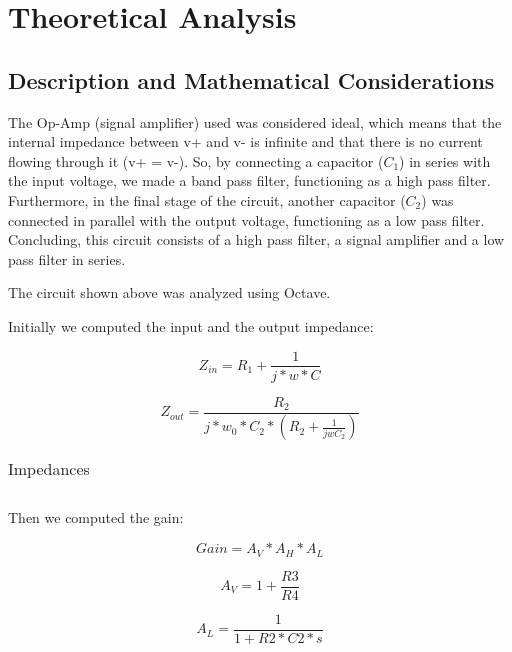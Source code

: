 \section{Theoretical Analysis}

\subsection{Description and Mathematical Considerations}

The Op-Amp (signal amplifier) used was considered ideal, which means that the internal impedance between v+ and v- is infinite and that there is no current flowing through it (v+ = v-). So, by connecting a capacitor ($C_1$) in series with the input voltage, we made a band pass filter, functioning as a high pass filter. Furthermore, in the final stage of the circuit, another capacitor ($C_2$) was connected in parallel with the output voltage, functioning as a low pass filter. Concluding, this circuit consists of a high pass filter, a signal amplifier and a low pass filter in series.

The circuit shown above was analyzed using Octave.

Initially we computed the input and the output impedance:

\begin{equation}
    Z_{in} = R_1 + \frac{1}{j*w*C}
\end{equation}

\begin{equation}
    Z_{out} = \frac{R_2}{j*w_0*C_2*(R_2+ \frac{1}{j w C_2})}
\end{equation}

\begin{table}[H]
\centering
\begin{tabularx}{0.6\textwidth} {
  | >{\raggedright\arraybackslash}X
  | >{\raggedleft\arraybackslash}X | }
 \hline

\end{tabularx}
\caption{Impedances}
\end{table}

Then we computed the gain:

\begin{equation}
    Gain = A_V * A_H * A_L
\end{equation}

\begin{equation}
A_{V}=  1+\frac{R3}{R4}
\end{equation}

\begin{equation}
A_{L}=  \frac{1}{1+R2*C2*s}
\end{equation}

